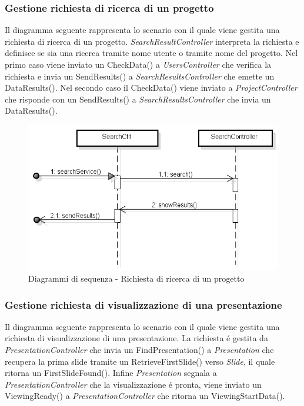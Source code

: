 \subsubsection{Gestione richiesta di ricerca di un progetto}
Il diagramma seguente rappresenta lo scenario con il quale viene gestita una richiesta di ricerca di un progetto. \textit{SearchResultController} interpreta la richiesta e definisce se sia una ricerca tramite nome utente o tramite nome del progetto. Nel primo caso viene inviato un CheckData() a \textit{UsersController} che verifica la richiesta e invia un SendResults() a \textit{SearchResultsController} che emette un DataResults(). Nel secondo caso il CheckData() viene inviato a \textit{ProjectController} che risponde con un SendResults() a \textit{SearchResultsController} che invia un DataResults().
\newpage
\begin{figure}[h]
	\centering
	\includegraphics[scale=0.5]{img/search.png}
	\caption{Diagrammi di sequenza - Richiesta di ricerca di un progetto}
\end{figure}

\subsubsection{Gestione richiesta di visualizzazione di una presentazione}
Il diagramma seguente rappresenta lo scenario con il quale viene gestita una richiesta di visualizzazione di una presentazione. La richiesta é gestita da \textit{PresentationController} che invia un FindPresentation() a \textit{Presentation} che recupera la prima slide tramite un RetrieveFirstSlide() verso \textit{Slide}, il quale ritorna un FirstSlideFound(). Infine \textit{Presentation} segnala a \textit{PresentationController} che la visualizzazione é pronta, viene inviato un ViewingReady() a \textit{PresentationController} che ritorna un ViewingStartData().


